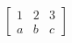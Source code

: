 \documentclass[preview]{standalone}
\begin{document}
\begin{align*}
\begin{bmatrix} 1 & 2 & 3 \\ a & b & c \end{bmatrix}
\end{align*}
\end{document}
